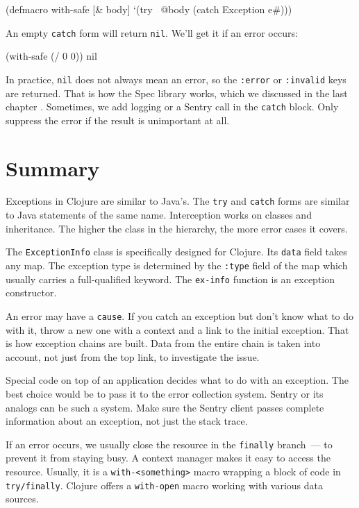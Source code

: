 
\begin{clojure}
(defmacro with-safe [& body]
  `(try
     ~@body
     (catch Exception e#)))
\end{clojure}

\noindent
An empty \verb|catch| form will return \verb|nil|. We'll get it if an error occurs:

\begin{clojure}
(with-safe (/ 0 0))
nil
\end{clojure}

In practice, \verb|nil| does not always mean an error, so the \verb|:error| or \verb|:invalid| keys are returned. That is how the Spec library works, which we discussed in the last chapter . Sometimes, we add logging or a Sentry call in the \verb|catch| block. Only suppress the error if the result is unimportant at all.

\section{Summary}

Exceptions in Clojure are similar to Java's. The \verb|try| and \verb|catch| forms are similar to Java statements of the same name. Interception works on classes and inheritance. The higher the class in the hierarchy, the more error cases it covers.

The \verb|ExceptionInfo| class is specifically designed for Clojure. Its \verb|data| field takes any map. The exception type is determined by the \verb|:type| field of the map which usually carries a full-qualified keyword. The \verb|ex-info| function is an exception constructor.

An error may have a \verb|cause|. If you catch an exception but don't know what to do with it, throw a new one with a context and a link to the initial exception. That is how exception chains are built. Data from the entire chain is taken into account, not just from the top link, to investigate the issue.

Special code on top of an application decides what to do with an exception. The best choice would be to pass it to the error collection system. Sentry or its analogs can be such a system. Make sure the Sentry client passes complete information about an exception, not just the stack trace.

If an error occurs, we usually close the resource in the \verb|finally| branch~--- to prevent it from staying busy. A context manager makes it easy to access the resource. Usually, it is a \verb|with-<something>| macro wrapping a block of code in \verb|try/finally|. Clojure offers a \verb|with-open| macro working with various data sources.

